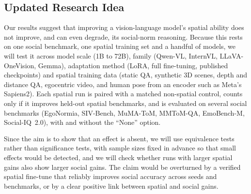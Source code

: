 \subsection{Updated Research Idea}
\label{sec:idea5-updated}

Our results suggest that improving a vision-language model's spatial ability does not improve, and can even degrade, its social-norm reasoning. Because this rests on one social benchmark, one spatial training set and a handful of models, we will test it across model scale (1B to 72B), family (Qwen-VL, InternVL, LLaVA-OneVision, Gemma), adaptation method (LoRA, full fine-tuning, published checkpoints) and spatial training data (static QA, synthetic 3D scenes, depth and distance QA, egocentric video, and human pose from an encoder such as Meta's Sapiens2). Each spatial run is paired with a matched non-spatial control, counts only if it improves held-out spatial benchmarks, and is evaluated on several social benchmarks (EgoNormia, SIV-Bench, MuMA-ToM, MMToM-QA, EmoBench-M, Social-IQ~2.0), with and without the ``None'' option.

Since the aim is to show that an effect is absent, we will use equivalence tests rather than significance tests, with sample sizes fixed in advance so that small effects would be detected, and we will check whether runs with larger spatial gains also show larger social gains. The claim would be overturned by a verified spatial fine-tune that reliably improves social accuracy across seeds and benchmarks, or by a clear positive link between spatial and social gains.
